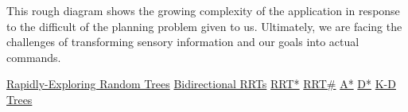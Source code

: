 \documentclass[twocolumn]{article}
\begin{document}
This rough diagram shows the growing complexity of the application in response to the difficult of the planning problem given to us. Ultimately, we are facing the challenges of transforming sensory information and our goals into actual commands.
\begin{thebibliography}{10}
 \href{http://msl.cs.uiuc.edu/rrt/papers.html}{Rapidly-Exploring Random Trees}
 \href{http://people.csail.mit.edu/aperez/obirrt/}{Bidirectional RRTs}
 \href{http://sertac.scripts.mit.edu/web/?page_id=15}{RRT*}
 \href{http://ieeexplore.ieee.org/xpl/login.jsp?tp=&arnumber=6630906&url=http://ieeexplore.ieee.org/iel7/6615630/6630547/06630906.pdf?arnumber=6630906}{RRT#}
 \href{http://dl.acm.org/citation.cfm?id=3830&coll=portal&dl=ACM}{A*}
 \href{http://citeseerx.ist.psu.edu/viewdoc/summary?doi=10.1.1.41.8257}{D*}
 \href{https://www.cise.ufl.edu/class/cot5520fa09/CG_RangeKDtrees.pdf}{K-D Trees}


\end{thebibliography}
\end{document}
